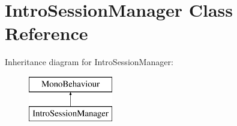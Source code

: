 \hypertarget{class_intro_session_manager}{}\section{Intro\+Session\+Manager Class Reference}
\label{class_intro_session_manager}
Inheritance diagram for Intro\+Session\+Manager\+:\begin{figure}[H]
\begin{center}
\leavevmode
\includegraphics[height=2.000000cm]{class_intro_session_manager}
\end{center}
\end{figure}

